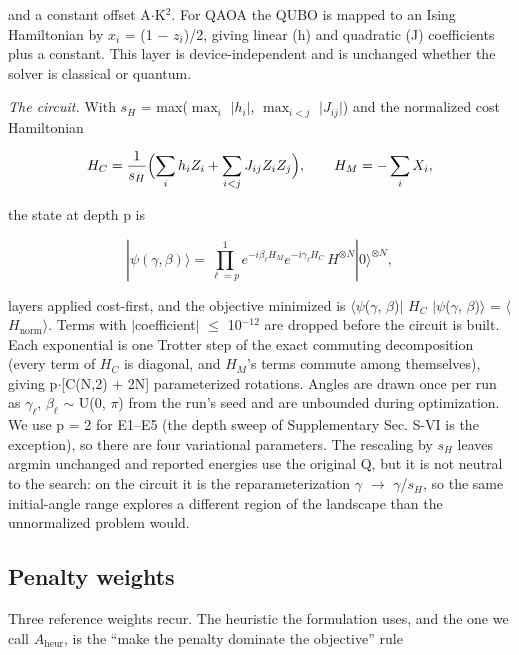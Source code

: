 \documentclass[journal]{IEEEtran}
\begin{document}
and a constant offset A$\cdot$K$^{2}$. For QAOA the QUBO is mapped to an Ising Hamiltonian by $x_{i}$ = (1 $-$ $z_{i}$)/2, giving linear (h) and quadratic (J) coefficients plus a constant. This layer is device-independent and is unchanged whether the solver is classical or quantum.


\textit{The circuit.} With $s_{H}$ = max($\max_{i}$ $|$$h_{i}$$|$, $\max_{i<j}$ $|$$J_{ij}$$|$) and the normalized cost Hamiltonian


\begin{equation*}
H_C = \frac{1}{s_H}\Bigl(\sum_i h_i Z_i + \sum_{i<j} J_{ij} Z_i Z_j\Bigr),\qquad H_M = -\sum_i X_i,
\end{equation*}


the state at depth p is


\begin{equation*}
|\psi(\gamma,\beta)\rangle = \prod_{\ell=p}^{1} e^{-i\beta_\ell H_M} e^{-i\gamma_\ell H_C}\, H^{\otimes N}|0\rangle^{\otimes N},
\end{equation*}


layers applied cost-first, and the objective minimized is $\langle$$\psi$($\gamma$, $\beta$)$|$ $H_{C}$ $|$$\psi$($\gamma$, $\beta$)$\rangle$ = $\langle$$H_{\mathrm{norm}}$$\rangle$. Terms with $|$coefficient$|$ $\leq$ 10$^{-12}$ are dropped before the circuit is built. Each exponential is one Trotter step of the exact commuting decomposition (every term of $H_{C}$ is diagonal, and $H_{M}$'s terms commute among themselves), giving p$\cdot$[C(N,2) + 2N] parameterized rotations. Angles are drawn once per run as $\gamma_{\ell}$, $\beta_{\ell}$ $\sim$ U(0, $\pi$) from the run's seed and are unbounded during optimization. We use p = 2 for E1--E5 (the depth sweep of Supplementary Sec. S-VI is the exception), so there are four variational parameters. The rescaling by $s_{H}$ leaves argmin unchanged and reported energies use the original Q, but it is not neutral to the search: on the circuit it is the reparameterization $\gamma$ $\rightarrow$ $\gamma$/$s_{H}$, so the same initial-angle range explores a different region of the landscape than the unnormalized problem would.


\subsection{Penalty weights}


Three reference weights recur. The heuristic the formulation uses, and the one we call $A_{\mathrm{heur}}$, is the ``make the penalty dominate the objective'' rule
\end{document}
